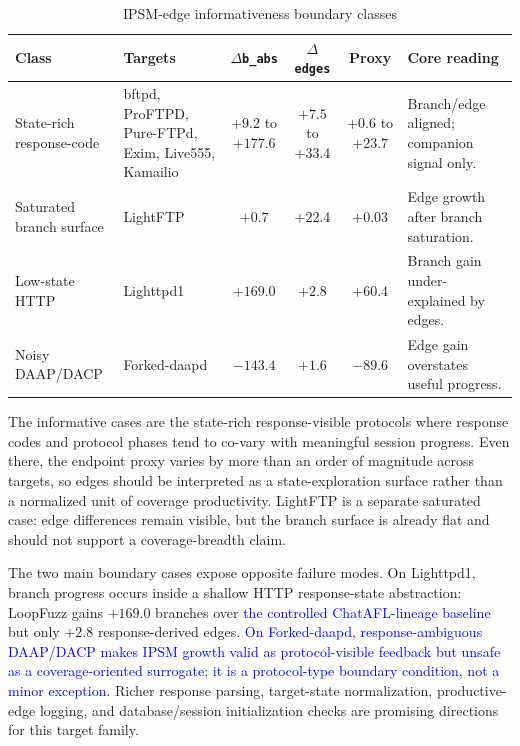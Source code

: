 \documentclass[final,5p,times,number]{elsarticle}
\begin{document}
\begin{table}[!t]
\centering
\caption{IPSM-edge informativeness boundary classes}
\label{tab:edge_productivity_boundary}
{\scriptsize
\setlength{\tabcolsep}{3.0pt}
\renewcommand{\arraystretch}{1.05}
\begin{tabularx}{\textwidth}{>{\raggedright\arraybackslash}p{}
                              >{\raggedright\arraybackslash}p{}
                              c c c X}
\toprule
Class & Targets & $\Delta$\texttt{b\_abs} & $\Delta$\texttt{edges} & Proxy & Core reading \\
\midrule
State-rich response-code & bftpd, ProFTPD, Pure-FTPd, Exim, Live555, Kamailio & $+9.2$ to $+177.6$ & $+7.5$ to $+33.4$ & $+0.6$ to $+23.7$ & Branch/edge aligned; companion signal only. \\
\midrule
Saturated branch surface & LightFTP & $+0.7$ & $+22.4$ & $+0.03$ & Edge growth after branch saturation. \\
\midrule
Low-state HTTP & Lighttpd1 & $+169.0$ & $+2.8$ & $+60.4$ & Branch gain under-explained by edges. \\
\midrule
Noisy DAAP/DACP & Forked-daapd & $-143.4$ & $+1.6$ & $-89.6$ & Edge gain overstates useful progress. \\
\bottomrule
\end{tabularx}
}
\end{table}

The informative cases are the state-rich response-visible protocols where response codes and protocol phases tend to co-vary with meaningful session progress. Even there, the endpoint proxy varies by more than an order of magnitude across targets, so edges should be interpreted as a state-exploration surface rather than a normalized unit of coverage productivity. LightFTP is a separate saturated case: edge differences remain visible, but the branch surface is already flat and should not support a coverage-breadth claim.

The two main boundary cases expose opposite failure modes. On Lighttpd1, branch progress occurs inside a shallow HTTP response-state abstraction: LoopFuzz gains $+169.0$ branches over \textcolor{blue}{the controlled ChatAFL-lineage baseline} but only $+2.8$ response-derived edges. \textcolor{blue}{On Forked-daapd, response-ambiguous DAAP/DACP makes IPSM growth valid as protocol-visible feedback but unsafe as a coverage-oriented surrogate; it is a protocol-type boundary condition, not a minor exception.} Richer response parsing, target-state normalization, productive-edge logging, and database/session initialization checks are promising directions for this target family.
\end{document}

